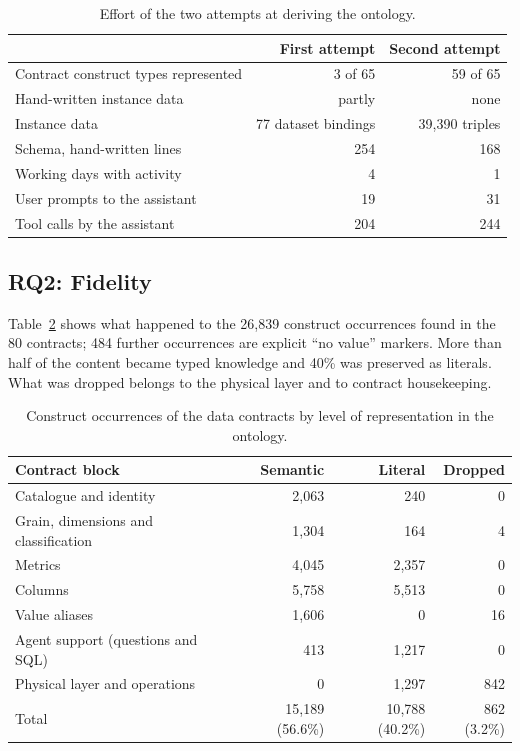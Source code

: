\begin{table}[ht]
\centering\small
\caption{Effort of the two attempts at deriving the ontology.}
\label{tab:effort}
\begin{tabular}{lrr}
\toprule
 & First attempt & Second attempt \\
\midrule
Contract construct types represented & 3 of 65 & 59 of 65 \\
Hand-written instance data & partly & none \\
Instance data & 77 dataset bindings & 39{,}390 triples \\
Schema, hand-written lines & 254 & 168 \\
Working days with activity & 4 & 1 \\
User prompts to the assistant & 19 & 31 \\
Tool calls by the assistant & 204 & 244 \\
\bottomrule
\end{tabular}
\end{table}

\subsection{RQ2: Fidelity}
Table~\ref{tab:fidelity} shows what happened to the 26{,}839 construct occurrences found in
the 80 contracts; 484 further occurrences are explicit ``no value'' markers. More than half
of the content became typed knowledge and 40\% was preserved as literals. What was dropped
belongs to the physical layer and to contract housekeeping.

\begin{table}[ht]
\centering\small
\caption{Construct occurrences of the data contracts by level of representation in the ontology.}
\label{tab:fidelity}
\begin{tabular}{lrrr}
\toprule
Contract block & Semantic & Literal & Dropped \\
\midrule
Catalogue and identity & 2{,}063 & 240 & 0 \\
Grain, dimensions and classification & 1{,}304 & 164 & 4 \\
Metrics & 4{,}045 & 2{,}357 & 0 \\
Columns & 5{,}758 & 5{,}513 & 0 \\
Value aliases & 1{,}606 & 0 & 16 \\
Agent support (questions and SQL) & 413 & 1{,}217 & 0 \\
Physical layer and operations & 0 & 1{,}297 & 842 \\
\midrule
Total & 15{,}189 (56.6\%) & 10{,}788 (40.2\%) & 862 (3.2\%) \\
\bottomrule
\end{tabular}
\end{table}

